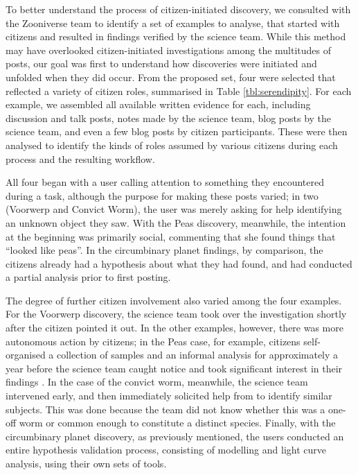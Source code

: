 \documentclass{sigchi}
\begin{document}
To better understand the process of citizen-initiated discovery, we consulted with the Zooniverse team to identify a set of examples to analyse, that started with citizens and resulted in findings verified by the science team.  While this method may have overlooked citizen-initiated investigations among the multitudes of posts, our goal was first to understand how discoveries were initiated and unfolded when they did occur.  From the proposed set, four were selected that reflected a variety of citizen roles, summarised in Table \ref{tbl:serendipity}. For each example, we assembled all available written evidence for each, including discussion and talk posts, notes made by the science team, blog posts by the science team, and even a few blog posts by citizen participants.  These were then analysed to identify the kinds of roles assumed by various citizens during each process and the resulting workflow.

All four began with a user calling attention to something they encountered during a task, although the purpose for making these posts varied; in two (Voorwerp and Convict Worm), the user was merely asking for help identifying an unknown object they saw.  With the Peas discovery, meanwhile, the intention at the beginning was primarily social, commenting that she found things that ``looked like peas''.  In the circumbinary planet findings, by comparison, the citizens already had a hypothesis about what they had found, and had conducted a partial analysis prior to first posting.

The degree of further citizen involvement also varied among the four examples. For the Voorwerp discovery, the science team took over the investigation shortly after the citizen pointed it out. In the other examples, however, there was more autonomous action by citizens; in the Peas case, for example, citizens self-organised a collection of samples and an informal analysis for approximately a year before the science team caught notice and took significant interest in their findings \cite{story-of-the-peas}. In the case of the convict worm, meanwhile, the science team intervened early, and then immediately solicited help from to identify similar subjects.  This was done because the team did not know whether this was a one-off worm or common enough to constitute a distinct species. Finally, with the circumbinary planet discovery, as previously mentioned, the users conducted an entire hypothesis validation process, consisting of modelling and light curve analysis, using their own sets of tools.
\end{document}
